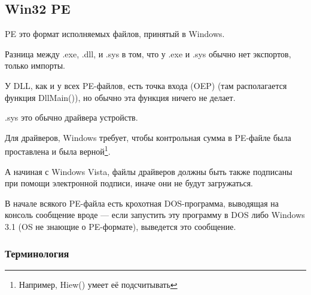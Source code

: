 \subsection{Win32 PE}
\label{win32_pe}

\acs{PE} это формат исполняемых файлов, принятый в Windows.

Разница между .exe, .dll, и .sys в том, что у .exe и .sys обычно нет экспортов, только импорты.

У \ac{DLL}, как и у всех PE-файлов, есть точка входа (\ac{OEP})
(там располагается функция DllMain()), но обычно эта функция ничего не делает.

.sys это обычно драйвера устройств.

Для драйверов, Windows требует, чтобы контрольная сумма в PE-файле была проставлена и была верной\footnote{Например, Hiew() умеет её подсчитывать}.

А начиная с Windows Vista, файлы драйверов должны быть также подписаны при помощи электронной подписи, иначе они не будут загружаться.


В начале всякого PE-файла есть крохотная DOS-программа,
выводящая на консоль сообщение вроде  --- если запустить эту программу в DOS либо Windows 3.1 (\ac{OS} не знающие о PE-формате), 
выведется это сообщение.

\subsubsection{Терминология}

